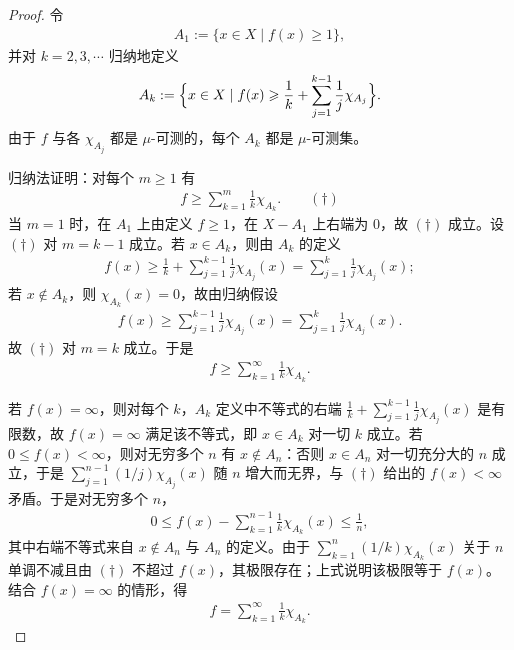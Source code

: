 \documentclass[../../main.tex]{subfiles}
\begin{document}
\begin{proof}
令
\begin{align*}
A_{1}:=\{x\in X\mid f(x)\geqslant1\},
\end{align*}
并对 $k=2,3,\cdots$ 归纳地定义
\begin{align*}
A_{k}:=\Bigl\{x\in X\mid f(x)\geqslant\frac{1}{k}+\sum_{j=1}^{k-1}\frac{1}{j}\chi_{A_{j}}\Bigr\}.
\end{align*}
由于 $f$ 与各 $\chi_{A_{j}}$ 都是 $\mu$-可测的，每个 $A_{k}$ 都是 $\mu$-可测集。

归纳法证明：对每个 $m\geqslant1$ 有
\begin{align*}
f\geqslant\sum_{k=1}^{m}\frac{1}{k}\chi_{A_{k}}.\qquad(\dagger)
\end{align*}
当 $m=1$ 时，在 $A_{1}$ 上由定义 $f\geqslant1$，在 $X-A_{1}$ 上右端为 $0$，故 $(\dagger)$ 成立。设 $(\dagger)$ 对 $m=k-1$ 成立。若 $x\in A_{k}$，则由 $A_{k}$ 的定义
\begin{align*}
f(x)\geqslant\frac{1}{k}+\sum_{j=1}^{k-1}\frac{1}{j}\chi_{A_{j}}(x)=\sum_{j=1}^{k}\frac{1}{j}\chi_{A_{j}}(x);
\end{align*}
若 $x\notin A_{k}$，则 $\chi_{A_{k}}(x)=0$，故由归纳假设
\begin{align*}
f(x)\geqslant\sum_{j=1}^{k-1}\frac{1}{j}\chi_{A_{j}}(x)=\sum_{j=1}^{k}\frac{1}{j}\chi_{A_{j}}(x).
\end{align*}
故 $(\dagger)$ 对 $m=k$ 成立。于是
\begin{align*}
f\geqslant\sum_{k=1}^{\infty}\frac{1}{k}\chi_{A_{k}}.
\end{align*}

若 $f(x)=\infty$，则对每个 $k$，$A_{k}$ 定义中不等式的右端 $\frac{1}{k}+\sum_{j=1}^{k-1}\frac{1}{j}\chi_{A_{j}}(x)$ 是有限数，故 $f(x)=\infty$ 满足该不等式，即 $x\in A_{k}$ 对一切 $k$ 成立。若 $0\leqslant f(x)<\infty$，则对无穷多个 $n$ 有 $x\notin A_{n}$：否则 $x\in A_{n}$ 对一切充分大的 $n$ 成立，于是 $\sum_{j=1}^{n-1}(1/j)\chi_{A_{j}}(x)$ 随 $n$ 增大而无界，与 $(\dagger)$ 给出的 $f(x)<\infty$ 矛盾。于是对无穷多个 $n$，
\begin{align*}
0\leqslant f(x)-\sum_{k=1}^{n-1}\frac{1}{k}\chi_{A_{k}}(x)\leqslant\frac{1}{n},
\end{align*}
其中右端不等式来自 $x\notin A_{n}$ 与 $A_{n}$ 的定义。由于 $\sum_{k=1}^{n}(1/k)\chi_{A_{k}}(x)$ 关于 $n$ 单调不减且由 $(\dagger)$ 不超过 $f(x)$，其极限存在；上式说明该极限等于 $f(x)$。结合 $f(x)=\infty$ 的情形，得
\begin{align*}
f=\sum_{k=1}^{\infty}\frac{1}{k}\chi_{A_{k}}.
\end{align*}
\end{proof}
\end{document}

